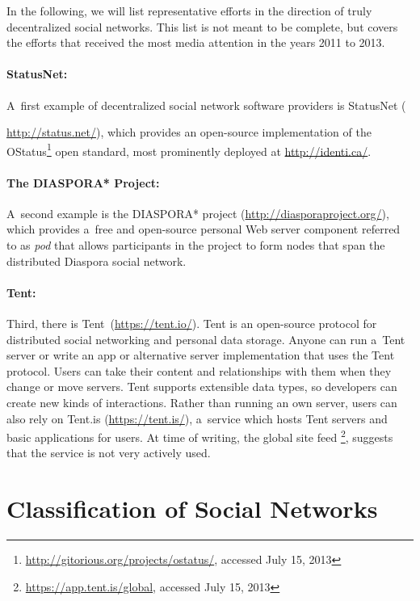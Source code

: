 In the following, we will list representative efforts
in the direction of truly decentralized social networks.
This list is not meant to be complete,
but covers the efforts that received the most media attention
in the years 2011 to 2013.

\paragraph{StatusNet:}

A~first example of decentralized social network software providers
is StatusNet ({\url{http://status.net/}),
which provides an open-source implementation of the
OStatus\footnote{\url{http://gitorious.org/projects/ostatus/}, accessed July 15, 2013}
open standard, most prominently deployed
at \url{http://identi.ca/}.

\paragraph{The DIASPORA* Project:}

A~second example is the DIASPORA* project (\url{http://diasporaproject.org/}),
which provides a~free and open-source personal Web server component
referred to as \emph{pod} that allows
participants in the project to form nodes
that span the distributed Diaspora social network.

\paragraph{Tent:}

Third, there is Tent\texttrademark~(\url{https://tent.io/}).
Tent is an open-source protocol for distributed social networking
and personal data storage.
Anyone can run a~Tent server
or write an app or alternative server implementation
that uses the Tent protocol.
Users can take their content and relationships with them
when they change or move servers.
Tent supports extensible data types,
so developers can create new kinds of interactions.
Rather than running an own server,
users can also rely on Tent.is (\url{https://tent.is/}),
a~service which hosts Tent servers
and basic applications for users.
At time of writing, the global site feed%
\footnote{\url{https://app.tent.is/global},
accessed July 15, 2013},
suggests that the service is not very actively used.

\section{Classification of Social Networks}
\label{sec:classification-of-social-networks}

}
